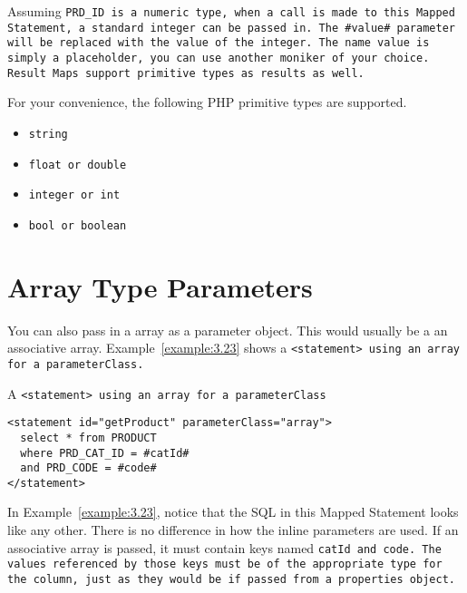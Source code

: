 Assuming \tt{PRD\_ID} is a numeric type, when a call is made to this Mapped
Statement, a standard integer can be passed in. The \tt{\#value\#} parameter
will be replaced with the value of the integer. The name \tt{value} is simply
a placeholder, you can use another moniker of your choice. Result Maps support
primitive types as results as well.

For your convenience, the following PHP primitive types are supported.
\begin{itemize}
  \item \tt{string}
  \item \tt{float} or \tt{double}
  \item \tt{integer} or \tt{int}
  \item \tt{bool} or \tt{boolean}
\end{itemize}

\section{Array Type Parameters}
You can also pass in a array as a parameter object. This would usually be a an
associative array. Example~\ref{example:3.23} shows a \tt{<statement>} using
an array for a \tt{parameterClass}.


\begin{example}\label{example:3.23}
A \tt{<statement>} using an array for a \tt{parameterClass}
\begin{verbatim}
<statement id="getProduct" parameterClass="array">
  select * from PRODUCT
  where PRD_CAT_ID = #catId#
  and PRD_CODE = #code#
</statement>
\end{verbatim}
\end{example}

In Example~\ref{example:3.23}, notice that the SQL in this Mapped Statement
looks like any other. There is no difference in how the inline parameters are
used. If an associative array is passed, it must contain keys named \tt{catId}
and \tt{code}. The values referenced by those keys must be of the appropriate
type for the column, just as they would be if passed from a properties object.
